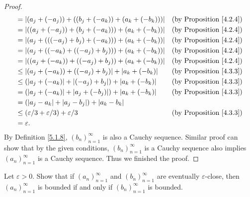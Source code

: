 \begin{proof}
\begin{align*}
&= \abs*{(a_j + (-a_j)) + ((b_j + (-a_k)) + (a_k + (-b_k)))} & \text{(by Proposition \ref{4.2.4})} \\
&= \abs*{((a_j + (-a_j)) + (b_j + (-a_k))) + (a_k + (-b_k))} & \text{(by Proposition \ref{4.2.4})} \\
&= \abs*{(a_j + (((-a_j) + b_j) + (-a_k))) + (a_k + (-b_k))} & \text{(by Proposition \ref{4.2.4})} \\
&= \abs*{(a_j + ((-a_k) + ((-a_j) + b_j))) + (a_k + (-b_k))} & \text{(by Proposition \ref{4.2.4})} \\
&= \abs*{((a_j + (-a_k)) + ((-a_j) + b_j)) + (a_k + (-b_k))} & \text{(by Proposition \ref{4.2.4})} \\
&\leq \abs*{(a_j + (-a_k)) + ((-a_j) + b_j)} + \abs*{a_k + (-b_k)} & \text{(by Proposition \ref{4.3.3})} \\
&\leq (\abs*{a_j + (-a_k)} + \abs*{(-a_j) + b_j}) + \abs*{a_k + (-b_k)} & \text{(by Proposition \ref{4.3.3})} \\
&= (\abs*{a_j + (-a_k)} + \abs*{a_j + (-b_j)}) + \abs*{a_k + (-b_k)} & \text{(by Proposition \ref{4.3.3})} \\
&= (\abs*{a_j - a_k} + \abs*{a_j - b_j}) + \abs*{a_k - b_k} \\
&\leq (\varepsilon / 3 + \varepsilon / 3) + \varepsilon / 3 & \text{(by Proposition \ref{4.3.3})} \\
&= \varepsilon.
\end{align*}
By Definition \ref{5.1.8}, \((b_n)_{n = 1}^{\infty}\) is also a Cauchy sequence.
Similar proof can show that by the given conditions, \((b_n)_{n = 1}^{\infty}\) is a Cauchy sequence also implies \((a_n)_{n = 1}^{\infty}\) is a Cauchy sequence.
Thus we finished the proof.
\end{proof}

\begin{exercise}\label{ex 5.2.2}
Let \(\varepsilon > 0\).
Show that if \((a_n)_{n = 1}^{\infty}\) and \((b_n)_{n = 1}^{\infty}\) are eventually \(\varepsilon\)-close, then \((a_n)_{n = 1}^{\infty}\) is bounded if and only if \((b_n)_{n = 1}^{\infty}\) is bounded.
\end{exercise}

